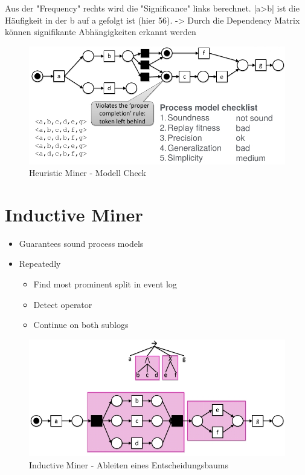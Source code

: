 Aus der "Frequency" rechts wird die "Significance" links berechnet. |a>b| ist die Häufigkeit in der b auf a gefolgt ist (hier 56).
-> Durch die Dependency Matrix können signifikante Abhängigkeiten erkannt werden

\begin{figure}[H]
\includegraphics[width=14cm]{Chapters/Notizen_Graphics/HeuristicsMiner_conclus.jpg}
\caption{Heuristic Miner - Modell Check} 
\end{figure}


\section{Inductive Miner}
\begin{itemize}
\setlength{\itemsep}{3pt}
\item Guarantees sound process models
\item Repeatedly
	\begin{itemize}
	\item Find most prominent split in event log
	\item Detect operator
	\item Continue on both sublogs
	\end{itemize}
\end{itemize}

\begin{figure} [H]
\includegraphics[width=14cm]{Chapters/Notizen_Graphics/InductMin_soundness.jpg}
\vspace*{.02\textheight}
\caption{Inductive Miner - Ableiten eines Entscheidungsbaums} 
\end{figure} 


